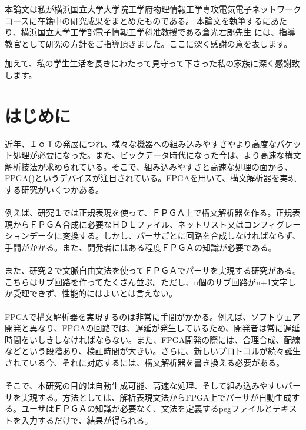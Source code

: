 \documentclass[12pt,oneside]{report}
\begin{document}

本論文は私が横浜国立大学大学院工学府物理情報工学専攻電気電子ネットワークコースに在籍中の研究成果をまとめたものである。
本論文を執筆するにあたり、横浜国立大学工学部電子情報工学科准教授である倉光君郎先生
には、指導教官として研究の方針をご指導頂きました。ここに深く感謝の意を表します。


加えて、私の学生生活を長きにわたって見守って下さった私の家族に深く感謝致します。
\afterpreface

\chapter{はじめに}
\label{Introduction}

近年、ＩｏＴの発展につれ、様々な機器への組み込みやすさやより高度なパケット処理が必要になった。また、ビックデータ時代になった今は、より高速な構文解析技法が求められている。そこで、組み込みやすさと高速な処理の面から、FPGA()というデバイスが注目されている。FPGAを用いて、構文解析器を実現する研究がいくつかある。\\
\\
例えば、研究１では正規表現を使って、ＦＰＧＡ上で構文解析器を作る。正規表現からＦＰＧＡ合成に必要なＨＤＬファイル、ネットリスト又はコンフィグレーションデータに変換する。しかし、パーサごとに回路を合成しなければならず、手間がかかる。また、開発者にはある程度ＦＰＧＡの知識が必要である。\\
\\
また、研究２で文脈自由文法を使ってＦＰＧＡでパーサを実現する研究がある。こちらはサブ回路を作ってたくさん並ぶ。ただし、n個のサブ回路がn+1文字しか受理できず、性能的にはよいとは言えない。\\
\\

FPGAで構文解析器を実現するのは非常に手間がかかる。例えば、ソフトウェア開発と異なり、FPGAの回路では、遅延が発生しているため、開発者は常に遅延時間をいしきしなければならない。また、FPGA開発の際には、合理合成、配線などという段階あり、検証時間が大きい。さらに、新しいプロトコルが続々誕生されている今、それに対応するには、構文解析器を書き換える必要がある。\\
\\

そこで、本研究の目的は自動生成可能、高速な処理、そして組み込みやすいパーサを実現する。方法としては、解析表現文法からFPGA上でパーサが自動生成する。ユーザはＦＰＧＡの知識が必要なく、文法を定義するpegファイルとテキストを入力するだけで、結果が得られる。\\
\end{document}
